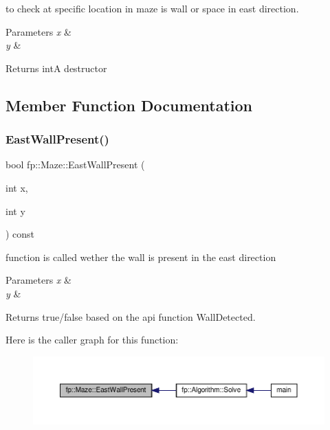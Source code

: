 to check at specific location in maze is wall or space in east direction. 


\begin{DoxyParams}{Parameters}
{\em x} & \\
\hline
{\em y} & \\
\hline
\end{DoxyParams}
\begin{DoxyReturn}{Returns}
intA destructor 
\end{DoxyReturn}


\subsection{Member Function Documentation}
\mbox{\label{classfp_1_1_maze_aed00bd0afedc44d52c1949dd769e68c2}} 
\subsubsection{\texorpdfstring{East\+Wall\+Present()}{EastWallPresent()}}
{\footnotesize\ttfamily bool fp\+::\+Maze\+::\+East\+Wall\+Present (\begin{DoxyParamCaption}\item[{int}]{x,  }\item[{int}]{y }\end{DoxyParamCaption}) const}



function is called wether the wall is present in the east direction 


\begin{DoxyParams}{Parameters}
{\em x} & \\
\hline
{\em y} & \\
\hline
\end{DoxyParams}
\begin{DoxyReturn}{Returns}
true/false based on the api function Wall\+Detected. 
\end{DoxyReturn}
Here is the caller graph for this function\+:
\nopagebreak
\begin{figure}[H]
\begin{center}
\leavevmode
\includegraphics[width=350pt]{classfp_1_1_maze_aed00bd0afedc44d52c1949dd769e68c2_icgraph}
\end{center}
\end{figure}
\mbox{\label{classfp_1_1_maze_a7aed0c5288e08efda078782f23bc8368}} 
